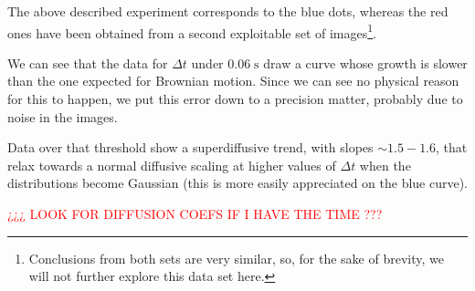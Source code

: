 The above described experiment corresponds to the blue dots, whereas the red ones have been obtained from a second exploitable set of images\footnote{Conclusions from both sets are very similar, so, for the sake of brevity, we will not further explore this data set here.}. 

We can see that the data for $\Delta t$ under $0.06 \; \textrm{s}$ draw a curve whose growth is slower than the one expected for Brownian motion. Since we can see no physical reason for this to happen, we put this error down to a precision matter, probably due to noise in the images.

Data over that threshold show a superdiffusive trend, with slopes $\sim 1.5 - 1.6$, that relax towards a normal diffusive scaling at higher values of $\Delta t$ when the distributions become Gaussian (this is more easily appreciated on the blue curve).

\textcolor{red}{¿¿¿ LOOK FOR DIFFUSION COEFS IF I HAVE THE TIME ???}
